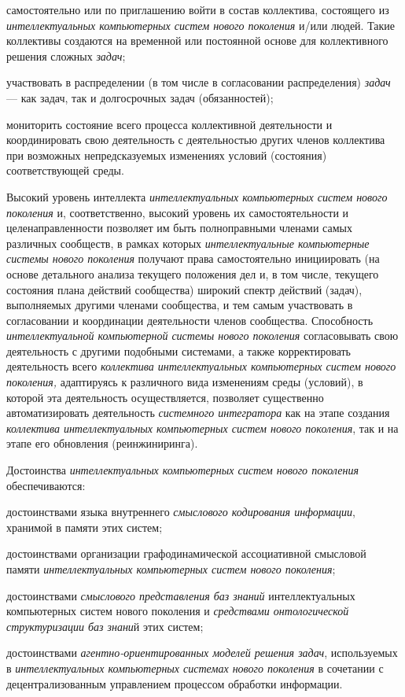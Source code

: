 \begin{textitemize}
	\item самостоятельно или по приглашению войти в состав коллектива, состоящего из \textit{интеллектуальных компьютерных систем нового поколения} и/или людей. Такие коллективы создаются на временной или постоянной основе для коллективного решения сложных \textit{задач};
	\item участвовать в распределении (в том числе в согласовании распределения) \textit{задач} --- как  задач, так и долгосрочных задач (обязанностей);
	\item мониторить состояние всего процесса коллективной деятельности и координировать свою деятельность с деятельностью других членов коллектива при возможных непредсказуемых изменениях условий (состояния) соответствующей среды.
\end{textitemize}

Высокий уровень интеллекта \textit{интеллектуальных компьютерных систем нового поколения} и, соответственно, высокий уровень их самостоятельности и целенаправленности позволяет им быть полноправными членами самых различных сообществ, в рамках которых \textit{интеллектуальные компьютерные системы нового поколения} получают права самостоятельно инициировать (на основе детального анализа текущего положения дел и, в том числе, текущего состояния плана действий сообщества) широкий спектр действий (задач), выполняемых другими членами сообщества, и тем самым участвовать в согласовании и координации деятельности членов сообщества. Способность \textit{интеллектуальной компьютерной системы нового поколения} согласовывать свою деятельность с другими подобными системами, а также корректировать деятельность всего \textit{коллектива интеллектуальных компьютерных систем нового поколения,} адаптируясь к различного вида изменениям среды (условий), в которой эта деятельность осуществляется, позволяет существенно автоматизировать деятельность \textit{системного интегратора} как на этапе создания \textit{коллектива интеллектуальных компьютерных систем нового поколения}, так и на этапе его обновления (реинжиниринга).

Достоинства \textit{интеллектуальных компьютерных систем нового поколения} обеспечиваются:

\begin{textitemize}
	\item достоинствами языка внутреннего \textit{смыслового кодирования информации}, хранимой в памяти этих систем;
	\item достоинствами организации графодинамической ассоциативной смысловой памяти \textit{интеллектуальных компьютерных систем нового поколения};
	\item достоинствами \textit{смыслового представления баз знаний} интеллектуальных компьютерных систем нового поколения и \textit{средствами онтологической структуризации баз знани}й этих систем;
	\item достоинствами \textit{агентно-ориентированных моделей решения задач}, используемых в \textit{интеллектуальных компьютерных системах нового поколения} в сочетании с децентрализованным управлением процессом обработки информации.
\end{textitemize}

